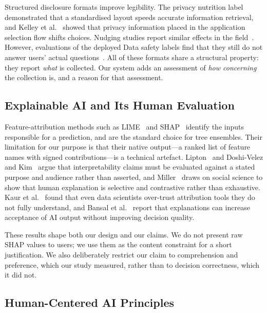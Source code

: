 \documentclass[sigconf]{acmart}
\begin{document}
Structured disclosure formats improve legibility. The privacy nutrition
label~\cite{kelley2009nutrition} demonstrated that a standardised layout
speeds accurate information retrieval, and Kelley et
al.~\cite{kelley2013privacy} showed that privacy information placed in the
application selection flow shifts choices. Nudging studies report similar
effects in the field~\cite{almuhimedi2015nudges}. However, evaluations of
the deployed Data safety labels find that they still do not answer users'
actual questions~\cite{zhang2022datasafety}. All of these formats share a
structural property: they report \emph{what} is collected. Our system adds
an assessment of \emph{how concerning} the collection is, and a reason for
that assessment.

\subsection{Explainable AI and Its Human Evaluation}

Feature-attribution methods such as LIME~\cite{ribeiro2016lime} and
SHAP~\cite{lundberg2017shap, lundberg2020treeshap} identify the inputs
responsible for a prediction, and are the standard choice for tree
ensembles. Their limitation for our purpose is that their native output---a
ranked list of feature names with signed contributions---is a technical
artefact. Lipton~\cite{lipton2018mythos} and Doshi-Velez and
Kim~\cite{doshivelez2017rigorous} argue that interpretability claims must
be evaluated against a stated purpose and audience rather than asserted,
and Miller~\cite{miller2019explanation} draws on social science to show
that human explanation is selective and contrastive rather than exhaustive.
Kaur et al.~\cite{kaur2020interpreting} found that even data scientists
over-trust attribution tools they do not fully understand, and Bansal et
al.~\cite{bansal2021wholeexceeds} report that explanations can increase
acceptance of AI output without improving decision quality.

These results shape both our design and our claims. We do not present raw
SHAP values to users; we use them as the content constraint for a short
justification. We also deliberately restrict our claim to comprehension and
preference, which our study measured, rather than to decision correctness,
which it did not.

\subsection{Human-Centered AI Principles}
\end{document}
